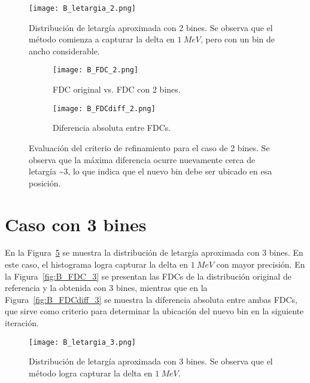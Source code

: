 \begin{figure}[H]
    \centering
    \texttt{[image: B\_letargia\_2.png]}
    \caption{Distribución de letargía aproximada con 2 bines. Se observa que el método comienza a capturar la delta en $1~MeV$, pero con un bin de ancho considerable.}
    \label{fig:B_letargia_2}
\end{figure}

\begin{figure}[H]
    \centering
    \begin{subfigure}[b]{0.46\textwidth}
        \texttt{[image: B\_FDC\_2.png]}
        \caption{FDC original vs. FDC con 2 bines.}
        \label{fig:B_FDC_2}
    \end{subfigure}
    \hfill
    \begin{subfigure}[b]{0.46\textwidth}
        \texttt{[image: B\_FDCdiff\_2.png]}
        \caption{Diferencia absoluta entre FDCs.}
        \label{fig:B_FDCdiff_2}
    \end{subfigure}
    \caption{Evaluación del criterio de refinamiento para el caso de 2 bines. Se observa que la máxima diferencia ocurre nuevamente cerca de letargía \sim 3, lo que indica que el nuevo bin debe ser ubicado en esa posición.}
    \label{fig:B_FDC_2_2}
\end{figure}

\section*{Caso con 3 bines}

En la Figura~\ref{fig:B_letargia_3} se muestra la distribución de letargía aproximada con 3 bines. En este caso, el histograma logra capturar la delta en $1~MeV$ con mayor precisión. En la Figura~\ref{fig:B_FDC_3} se presentan las FDCs de la distribución original de referencia y la obtenida con 3 bines, mientras que en la Figura~\ref{fig:B_FDCdiff_3} se muestra la diferencia absoluta entre ambas FDCs, que sirve como criterio para determinar la ubicación del nuevo bin en la siguiente iteración.

\begin{figure}[H]
    \centering
    \texttt{[image: B\_letargia\_3.png]}
    \caption{Distribución de letargía aproximada con 3 bines. Se observa que el método logra capturar la delta en $1~MeV$.}
    \label{fig:B_letargia_3}
\end{figure}

